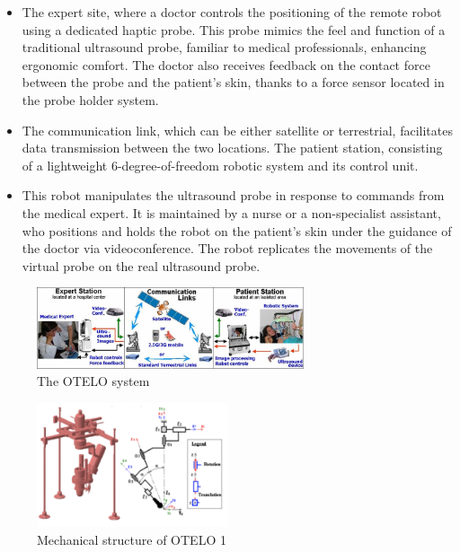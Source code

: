 \documentclass{article}
\begin{document}

\begin{itemize}
\item The expert site, where a doctor controls the positioning of the remote robot using a dedicated haptic probe. This probe mimics the feel and function of a traditional ultrasound probe, familiar to medical professionals, enhancing ergonomic comfort. The doctor also receives feedback on the contact force between the probe and the patient's skin, thanks to a force sensor located in the probe holder system.
\item The communication link, which can be either satellite or terrestrial, facilitates data transmission between the two locations.
The patient station, consisting of a lightweight 6-degree-of-freedom robotic system and its control unit. \item This robot manipulates the ultrasound probe in response to commands from the medical expert. It is maintained by a nurse or a non-specialist assistant, who positions and holds the robot on the patient’s skin under the guidance of the doctor via videoconference. The robot replicates the movements of the virtual probe on the real ultrasound probe.
\end{itemize}

\begin{figure}[h]
    \centering
    \includegraphics[width=0.7\textwidth]{OTELO.png}  
    \caption{The OTELO system}
    \label{fig:otelo}
\end{figure}


\begin{figure}[h]
    \centering
    \includegraphics[width=0.5\textwidth]{OTELO_structure.png}  
    \caption{Mechanical structure of OTELO 1}
    \label{fig:otelo struc}
\end{figure}
\end{document}
